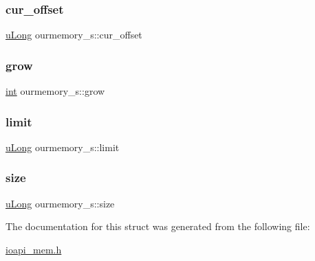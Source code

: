 \subsubsection{\texorpdfstring{cur\+\_\+offset}{cur\_offset}}
{\footnotesize\ttfamily \hyperlink{ioapi_8h_a50e9e9d5c30e481de822ad68fe537986}{u\+Long} ourmemory\+\_\+s\+::cur\+\_\+offset}

\mbox{\label{structourmemory__s_a566f3fb196847bc1eb1f739e6e89464f}} 
\subsubsection{\texorpdfstring{grow}{grow}}
{\footnotesize\ttfamily \hyperlink{lp__lib_8h_adeb9ec6400320e4923ac9d836d509ddb}{int} ourmemory\+\_\+s\+::grow}

\mbox{\label{structourmemory__s_a68febfbd7931c5a97d38794f60317c09}} 
\subsubsection{\texorpdfstring{limit}{limit}}
{\footnotesize\ttfamily \hyperlink{ioapi_8h_a50e9e9d5c30e481de822ad68fe537986}{u\+Long} ourmemory\+\_\+s\+::limit}

\mbox{\label{structourmemory__s_acbf51ab909811f599a1d53c6104f0210}} 
\subsubsection{\texorpdfstring{size}{size}}
{\footnotesize\ttfamily \hyperlink{ioapi_8h_a50e9e9d5c30e481de822ad68fe537986}{u\+Long} ourmemory\+\_\+s\+::size}



The documentation for this struct was generated from the following file\+:\begin{DoxyCompactItemize}
\item 
\hyperlink{ioapi__mem_8h}{ioapi\+\_\+mem.\+h}\end{DoxyCompactItemize}
